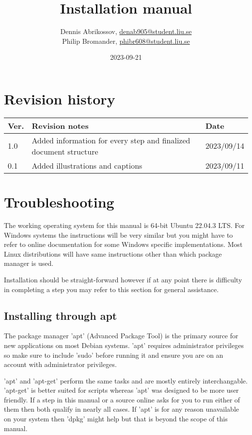\documentclass{liu_mall_engelska}
\author{Dennis Abrikossov, \url{denab905@student.liu.se}\\
  Philip Bromander, \url{phibr608@student.liu.se}}
\title{Installation manual}
\date{2023-09-21}
\begin{document}
    \projectpage
    \section{Revision history}
        \begin{table}[!h]
            \begin{tabularx}{\linewidth}{|l|X|l|}
            \hline
            Ver. & Revision notes & Date \\\hline
            1.0 & Added information for every step and finalized document structure & 2023/09/14 \\\hline
            0.1 & Added illustrations and captions & 2023/09/11 \\\hline
            \end{tabularx}
        \end{table}

\newpage
\section{Troubleshooting}
    The working operating system for this manual is 64-bit Ubuntu 22.04.3 LTS. For Windows systems the instructions will be very similar but you might have to refer to online documentation for some Windows specific implementations. Most Linux distributions will have same instructions other than which package manager is used.
    
    Installation should be straight-forward however if at any point there is difficulty in completing a step you may refer to this section for general assistance.

    \subsection{Installing through apt}
        The package manager 'apt' (Advanced Package Tool) is the primary source for new applications on most Debian systems. 'apt' requires administrator privileges so make sure to include 'sudo' before running it and ensure you are on an account with administrator privileges.

        'apt' and 'apt-get' perform the same tasks and are mostly entirely interchangable. 'apt-get' is better suited for scripts whereas 'apt' was designed to be more user friendly. If a step in this manual or a source online asks for you to run either of them then both qualify in nearly all cases. If 'apt' is for any reason unavailable on your system then 'dpkg' might help but that is beyond the scope of this manual.
        
\end{document}
